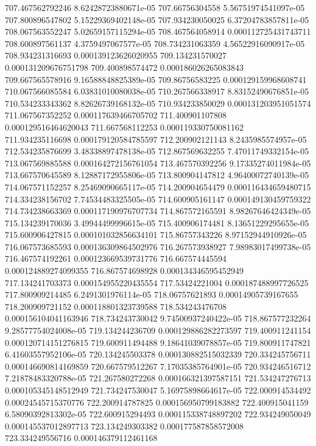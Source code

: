 {707.467562792246 8.62428723880671e-05
707.66756304558 5.56751974541097e-05
707.800896547802 5.15229369402148e-05
707.934230050025 6.37204783857811e-05
708.067563552247 5.02659157115294e-05
708.467564058914 0.000112725431743711
708.600897561137 4.3759497067577e-05
708.734231063359 4.56522916090917e-05
708.934231316693 0.000139123626020955
709.134231570027 0.000131209676751798
709.400898574472 0.000186026265083843
709.667565578916 9.16588848825389e-05
709.86756583225 0.000129159968608741
710.067566085584 6.03831010080038e-05
710.267566338917 8.83152490676851e-05
710.534233343362 8.82626739168132e-05
710.934233850029 0.000131203951051574
711.067567352252 0.000117639466705702
711.400901107808 0.000129516464620043
711.667568112253 0.000119330750081162
711.934235116698 0.000179120584785597
712.200902121143 8.2435985574957e-05
712.534235876699 3.48338897478138e-05
712.867569632255 7.47011749332154e-05
713.067569885588 0.000164272156761054
713.467570392256 9.17335274011984e-05
713.667570645589 8.12887172955806e-05
713.800904147812 4.96400072740139e-05
714.067571152257 8.25469090665117e-05
714.200904654479 0.000116434659480715
714.334238156702 7.74534483325505e-05
714.600905161147 0.000149130459759322
714.734238663369 0.000117190976707734
714.867572165591 8.98267646424349e-05
715.134239170036 3.49944499996615e-05
715.400906174481 8.13651229295655e-05
715.600906427815 0.000101032856634101
715.86757343226 8.97152944910926e-05
716.067573685593 0.000136309864502976
716.267573938927 7.98983017499738e-05
716.467574192261 0.000123669539731776
716.667574445594 0.000124889274099355
716.867574698928 0.000134346595452949
717.134241703373 0.000154955220435554
717.53424221004 0.000187488997726525
717.800909214485 6.2491301976114e-05
718.06757621893 0.00014905739167655
718.200909721152 0.000118801323739588
718.534243476708 0.000156104041163946
718.734243730042 9.74500937240422e-05
718.867577232264 9.28577754024008e-05
719.134244236709 0.000129886282273597
719.400911241154 0.000120714151276815
719.600911494488 9.18641039078857e-05
719.800911747821 6.41603557952106e-05
720.134245503378 0.000130882515032339
720.334245756711 0.000146690814169859
720.667579512267 7.17035385764901e-05
720.934246516712 7.21878483320788e-05
721.267580272268 0.000166321397587151
721.534247276713 0.000105345148512949
721.734247530047 5.16975898664617e-05
722.000914534492 0.00024545715370776
722.200914787825 0.000156950799183882
722.400915041159 6.58090392813302e-05
722.600915294493 0.000115338748897202
722.934249050049 0.000145537012897713
723.134249303382 0.000177587858572008
723.334249556716 0.000146379112461168
}
